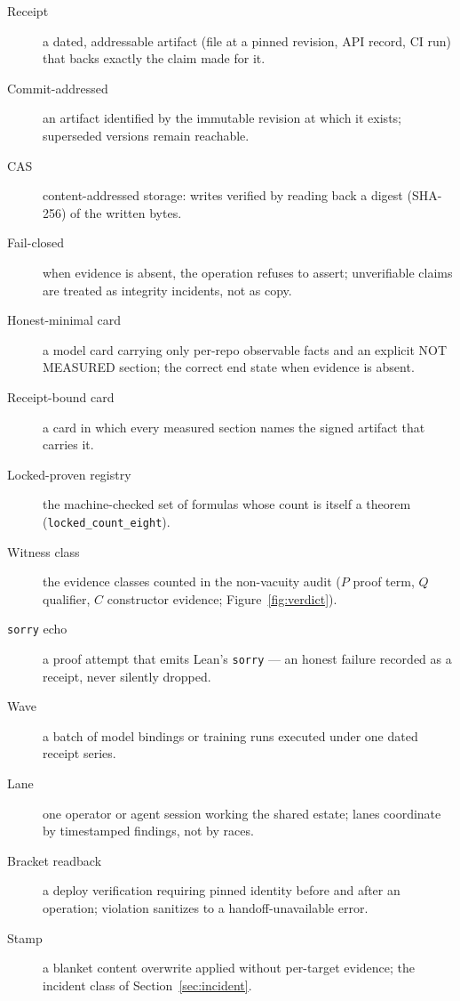 ﻿\documentclass[11pt]{article}
\begin{document}
\begin{description}
\item[Receipt] a dated, addressable artifact (file at a pinned revision, API record, CI run) that backs exactly the claim made for it.
\item[Commit-addressed] an artifact identified by the immutable revision at which it exists; superseded versions remain reachable.
\item[CAS] content-addressed storage: writes verified by reading back a digest (SHA-256) of the written bytes.
\item[Fail-closed] when evidence is absent, the operation refuses to assert; unverifiable claims are treated as integrity incidents, not as copy.
\item[Honest-minimal card] a model card carrying only per-repo observable facts and an explicit NOT MEASURED section; the correct end state when evidence is absent.
\item[Receipt-bound card] a card in which every measured section names the signed artifact that carries it.
\item[Locked-proven registry] the machine-checked set of formulas whose count is itself a theorem (\texttt{locked\_count\_eight}).
\item[Witness class] the evidence classes counted in the non-vacuity audit ($P$ proof term, $Q$ qualifier, $C$ constructor evidence; Figure~\ref{fig:verdict}).
\item[\texttt{sorry} echo] a proof attempt that emits Lean's \texttt{sorry} --- an honest failure recorded as a receipt, never silently dropped.
\item[Wave] a batch of model bindings or training runs executed under one dated receipt series.
\item[Lane] one operator or agent session working the shared estate; lanes coordinate by timestamped findings, not by races.
\item[Bracket readback] a deploy verification requiring pinned identity before and after an operation; violation sanitizes to a handoff-unavailable error.
\item[Stamp] a blanket content overwrite applied without per-target evidence; the incident class of Section~\ref{sec:incident}.
\end{description}
\end{document}
